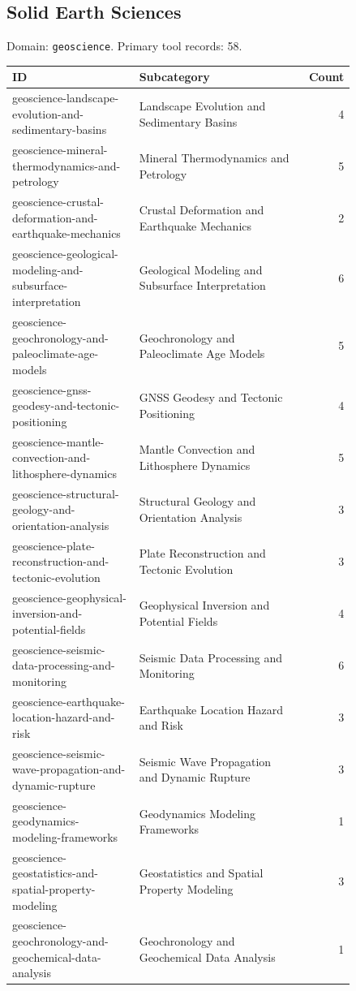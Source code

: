 \subsection{Solid Earth Sciences}
\noindent Domain: \texttt{geoscience}. Primary tool records: 58.
\begin{longtable}{p{0.37\linewidth}p{0.47\linewidth}r}
ID & Subcategory & Count\\\hline\endhead
geoscience-landscape-evolution-and-sedimentary-basins & Landscape Evolution and Sedimentary Basins & 4\\
geoscience-mineral-thermodynamics-and-petrology & Mineral Thermodynamics and Petrology & 5\\
geoscience-crustal-deformation-and-earthquake-mechanics & Crustal Deformation and Earthquake Mechanics & 2\\
geoscience-geological-modeling-and-subsurface-interpretation & Geological Modeling and Subsurface Interpretation & 6\\
geoscience-geochronology-and-paleoclimate-age-models & Geochronology and Paleoclimate Age Models & 5\\
geoscience-gnss-geodesy-and-tectonic-positioning & GNSS Geodesy and Tectonic Positioning & 4\\
geoscience-mantle-convection-and-lithosphere-dynamics & Mantle Convection and Lithosphere Dynamics & 5\\
geoscience-structural-geology-and-orientation-analysis & Structural Geology and Orientation Analysis & 3\\
geoscience-plate-reconstruction-and-tectonic-evolution & Plate Reconstruction and Tectonic Evolution & 3\\
geoscience-geophysical-inversion-and-potential-fields & Geophysical Inversion and Potential Fields & 4\\
geoscience-seismic-data-processing-and-monitoring & Seismic Data Processing and Monitoring & 6\\
geoscience-earthquake-location-hazard-and-risk & Earthquake Location Hazard and Risk & 3\\
geoscience-seismic-wave-propagation-and-dynamic-rupture & Seismic Wave Propagation and Dynamic Rupture & 3\\
geoscience-geodynamics-modeling-frameworks & Geodynamics Modeling Frameworks & 1\\
geoscience-geostatistics-and-spatial-property-modeling & Geostatistics and Spatial Property Modeling & 3\\
geoscience-geochronology-and-geochemical-data-analysis & Geochronology and Geochemical Data Analysis & 1\\
\end{longtable}
